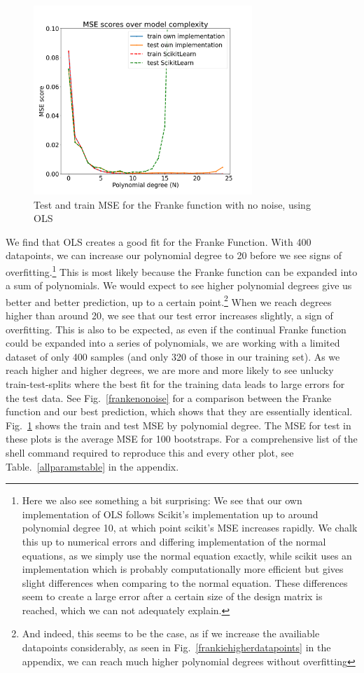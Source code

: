 \documentclass[twocolumn,10pt,cleanfoot]{asme2ej}
\begin{document}
\begin{figure} 
\centerline{\includegraphics[width=3.25in]{figure/frankenonoisemse.png}}
\caption{Test and train MSE for the Franke function with no noise, using OLS}
\label{frankenonoisemse}
\end{figure}

We find that OLS creates a good fit for the Franke Function. With 400 datapoints, we can increase our polynomial degree to 20 before we see signs of overfitting.\footnote{Here we also see something a bit surprising: We see that our own implementation of OLS follows Scikit's implementation up to around polynomial degree 10, at which point scikit's MSE increases rapidly. We chalk this up to numerical errors and differing implementation of the normal equations, as we simply use the normal equation exactly, while scikit uses an implementation which is probably computationally more efficient but gives slight differences when comparing to the normal equation. These differences seem to create a large error after a certain size of the design matrix is reached, which we can not adequately explain.} This is most likely because the Franke function can be expanded into a sum of polynomials. We would expect to see higher polynomial degrees give us better and better prediction, up to a certain point.\footnote{And indeed, this seems to be the case, as if we increase the availiable datapoints considerably, as seen in Fig.~\ref{frankiehigherdatapoints} in the appendix, we can reach much higher polynomial degrees without overfitting} When we reach degrees higher than around 20, we see that our test error increases slightly, a sign of overfitting. This is also to be expected, as even if the continual Franke function could be expanded into a series of polynomials, we are working with a limited dataset of only 400 samples (and only 320 of those in our training set). As we reach higher and higher degrees, we are more and more likely to see unlucky train-test-splits where the best fit for the training data leads to large errors for the test data. See Fig.~\ref{frankenonoise} for a comparison between the Franke function and our best prediction, which shows that they are essentially identical. Fig.~\ref{frankenonoisemse} shows the train and test MSE by polynomial degree. The MSE for test in these plots is the average MSE for 100 bootstraps. For a comprehensive list of the shell command required to reproduce this and every other plot, see Table.~\ref{allparamstable} in the appendix.
\end{document}
